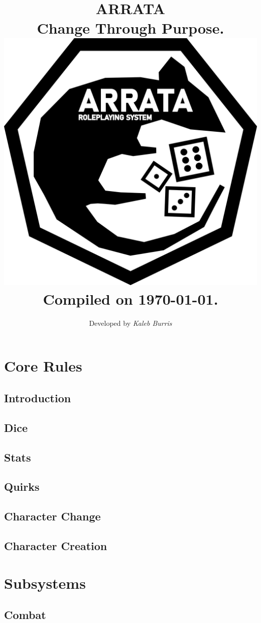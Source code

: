 \documentclass[oneside]{book}
\title{
    \textbf{ARRATA} 
    \\
    \large Change Through Purpose.
    \\
    \includegraphics[width=\textwidth]{rat.png}
    \\
    Compiled on \today.
}
\date{}
\author{Developed by {\em Kaleb Burris}}
\begin{document}
    \maketitle

    \let\cleardoublepage\clearpage
    \setlength{\headheight}{2cm}
    \addtolength{\topmargin}{-2cm}

    \tableofcontents

    \part{Core Rules}

    \chapter{Introduction}
    

    \chapter{Dice}
    

    \chapter{Stats}
    

    \chapter{Quirks}

    \chapter{Character Change}

    \chapter{Character Creation}

    \part{Subsystems}

    \chapter{Combat}
\end{document}
